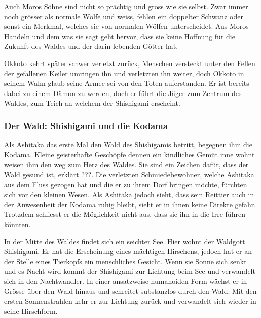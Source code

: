 Auch Moros Söhne sind nicht so prächtig und gross wie sie selbst. Zwar immer noch grösser als normale Wölfe und weiss, fehlen ein doppelter Schwanz oder sonst ein Merkmal, welches sie von normalen Wölfen unterscheidet. Aus Moros Handeln und dem was sie sagt geht hervor, dass sie keine Hoffnung für die Zukunft des Waldes und der darin lebenden Götter hat. 

Okkoto kehrt später schwer verletzt zurück, Menschen versteckt unter den Fellen der gefallenen Keiler umringen ihn und verletzten ihn weiter, doch Okkoto in seinem Wahn glaub seine Armee sei von den Toten auferstanden. Er ist bereits dabei zu einem Dämon zu werden, doch er führt die Jäger zum Zentrum des Waldes, zum Teich an welchem der Shishigami erscheint. 

\subsubsection*{Der Wald: Shishigami und die Kodama}
Als Ashitaka das erste Mal den Wald des Shishigamis betritt, begegnen ihm die Kodama. Kleine geisterhafte Geschöpfe dennen ein kindliches Gemüt inne wohnt weisen ihm den weg zum Herz des Waldes. Sie sind ein Zeichen dafür, dass der Wald gesund ist, erklärt ???. Die verletzten Schmiedebewohner, welche Ashitaka aus dem Fluss gezogen hat und die er zu ihrem Dorf bringen möchte, fürchten sich vor den kleinen Wesen. Als Ashitaka jedoch sieht, dass sein Reittier auch in der Anwesenheit der Kodama ruhig bleibt, sieht er in ihnen keine Direkte gefahr. Trotzdem schliesst er die Möglichkeit nicht aus, dass sie ihn in die Irre führen könnten.

In der Mitte des Waldes findet sich ein seichter See. Hier wohnt der Waldgott Shishigami. Er hat die Erscheinung eines mächtigen Hirschens, jedoch hat er an der Stelle eines Tierkopfs ein menschliches Gesicht. Wenn sie Sonne sich senkt und es Nacht wird kommt der Shishigami zur Lichtung beim See und verwandelt sich in den Nachtwandler. In einer ansatzweise humanoiden Form wächst er in Grösse über den Wald hinaus und schreitet substanzlos durch den Wald. Mit den ersten Sonnenstrahlen kehr er zur Lichtung zurück und verwandelt sich wieder in seine Hirschform. 

